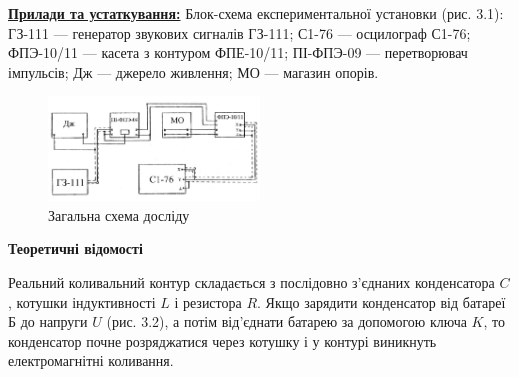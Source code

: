 \documentclass[12pt,a4paper]{article}
\begin{document}
    \textbf{\underline{Прилади та устаткування:}} Блок-схема експериментальної установки (рис. 3.1): ГЗ-111 --- генератор звукових сигналів ГЗ-111; С1-76 --- осцилограф С1-76;
    ФПЭ-10/11 --- касета з контуром ФПЕ-10/11; ПІ-ФПЭ-09 --- перетворювач імпульсів; Дж --- джерело живлення; МО --- магазин опорів.

    \begin{figure}[h!]

        \setcounter{figure}{0}                  %
        \renewcommand{\thefigure}{3.\arabic{figure}} %

        \centering
        \includegraphics[width=0.5\textwidth]{3.1.png}
        \caption{Загальна схема досліду}
        \label{fig1:schema}
    \end{figure}


    \begin{center}
        \textbf{\Large Теоретичні відомості}
    \end{center}

    \vspace{1em} %

    \setlength{\parindent}{1.5em}

    Реальний коливальний контур складається з послідовно з’єднаних конденсатора $C$, котушки індуктивності $L$
    і резистора $R$. Якщо зарядити конденсатор від батареї Б до напруги $U$ (рис. 3.2), а потім від’єднати батарею
    за допомогою ключа $K$, то конденсатор почне розряджатися через котушку і у контурі виникнуть електромагнітні коливання.
\end{document}

